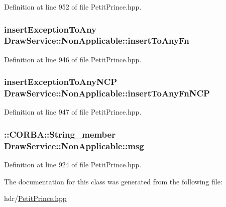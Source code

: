 Definition at line 952 of file Petit\+Prince.\+hpp.

\subsubsection[{\texorpdfstring{insert\+To\+Any\+Fn}{insertToAnyFn}}]{ insert\+Exception\+To\+Any Draw\+Service\+::\+Non\+Applicable\+::insert\+To\+Any\+Fn\hspace{0.3cm}{\ttfamily [static]}}\hypertarget{class_draw_service_1_1_non_applicable_a3d81026fedf74a52030527292e782f64}{}\label{class_draw_service_1_1_non_applicable_a3d81026fedf74a52030527292e782f64}


Definition at line 946 of file Petit\+Prince.\+hpp.

\subsubsection[{\texorpdfstring{insert\+To\+Any\+Fn\+N\+CP}{insertToAnyFnNCP}}]{ insert\+Exception\+To\+Any\+N\+CP Draw\+Service\+::\+Non\+Applicable\+::insert\+To\+Any\+Fn\+N\+CP\hspace{0.3cm}{\ttfamily [static]}}\hypertarget{class_draw_service_1_1_non_applicable_a1616cdc51c85c7a0b695c5977cd7ef2e}{}\label{class_draw_service_1_1_non_applicable_a1616cdc51c85c7a0b695c5977cd7ef2e}


Definition at line 947 of file Petit\+Prince.\+hpp.

\subsubsection[{\texorpdfstring{msg}{msg}}]{\setlength{\rightskip}{0pt plus 5cm}\+::C\+O\+R\+B\+A\+::\+String\+\_\+member Draw\+Service\+::\+Non\+Applicable\+::msg}\hypertarget{class_draw_service_1_1_non_applicable_a80d5412b7ad22c14c85808108d88e6c8}{}\label{class_draw_service_1_1_non_applicable_a80d5412b7ad22c14c85808108d88e6c8}


Definition at line 924 of file Petit\+Prince.\+hpp.



The documentation for this class was generated from the following file\+:\begin{DoxyCompactItemize}
\item 
hdr/\hyperlink{_petit_prince_8hpp}{Petit\+Prince.\+hpp}\end{DoxyCompactItemize}
